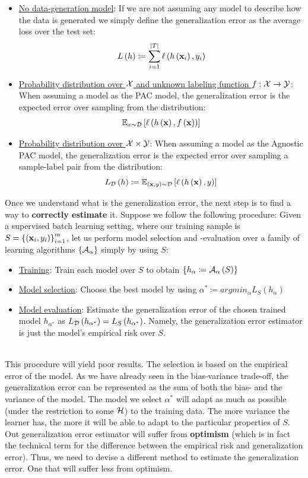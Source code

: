 \begin{itemize}
	\item \underline{No data-generation model}: If we are not assuming any model to describe how the data is generated we simply define the generalization error as the average loss over the test set: $$ L\left(h\right)\coloneqq \sum^{\left|T\right|}_{i=1} \ell\left(h\left(\mathbf{x}_i\right),y_i\right)$$
	\item\underline{Probability distribution over $\mathcal{X}$ and unknown labeling function $f:\mathcal{X}\rightarrow\mathcal{Y}$}: When assuming a model as the PAC model, the generalization error is the expected error over sampling from the distribution: $$ \mathbb{E}_{x\sim\mathcal{D}}\left[\ell\left(h\left(\mathbf{x}\right),f\left(\mathbf{x}\right)\right)\right] $$
	\item\underline{Probability distribution over $\mathcal{X}\times\mathcal{Y}$}: When assuming a model as the Agnostic PAC model, the generalization error is the expected error over sampling a sample-label pair from the distribution: $$ L_{\mathcal{D}}\left(h\right) \coloneqq \mathbb{E}_{\left(\mathbf{x},y\right)\sim\mathcal{D}}\left[\ell\left(h\left(\mathbf{x}\right),y\right)\right]$$
\end{itemize}


Once we understand what is the generalization error, the next step is to find a way to \textbf{correctly estimate} it. Suppose we follow the following procedure: Given a supervised batch learning setting, where our training sample is $S=\left\{\left(\mathbf{x}_i,y_i\right)\right\}^m_{i=1}$, let us perform model selection and -evaluation over a family of learning algorithms $\left\{\mathcal{A}_\alpha\right\}$ simply by using $S$:
\begin{itemize}
	\item \underline{Training}: Train each model over $S$ to obtain $\left\{h_\alpha\coloneqq \mathcal{A}_\alpha\left(S\right)\right\}$
	\item\underline{Model selection}: Choose the best model by using $\alpha^*\coloneqq argmin_\alpha L_S\left(h_\alpha\right)$
	\item\underline{Model evaluation}: Estimate the generalization error of the chosen trained model $h_{\alpha^*}$ as $L_{\mathcal{D}}\left(h_{\alpha^*}\right)=L_S\left(h_{\alpha^*}\right)$. Namely, the generalization error estimator is just the model's empirical risk over $S$.
\end{itemize}
~\\This procedure will yield poor results. The selection is based on the empirical error of the model. As we have already seen in the bias-variance trade-off, the generalization error can be represented as the sum of both the bias- and the variance of the model. The model we select $\alpha^*$ will adapt as much as possible (under the restriction to some $\mathcal{H}$) to the training data. The more variance the learner has, the more it will be able to adapt to the particular properties of $S$. Out generalization error estimator will suffer from \textbf{optimism} (which is in fact the technical term for the difference between the empirical risk and generalization error). Thus, we need to devise a different method to estimate the generalization error. One that will suffer less from optimism.

